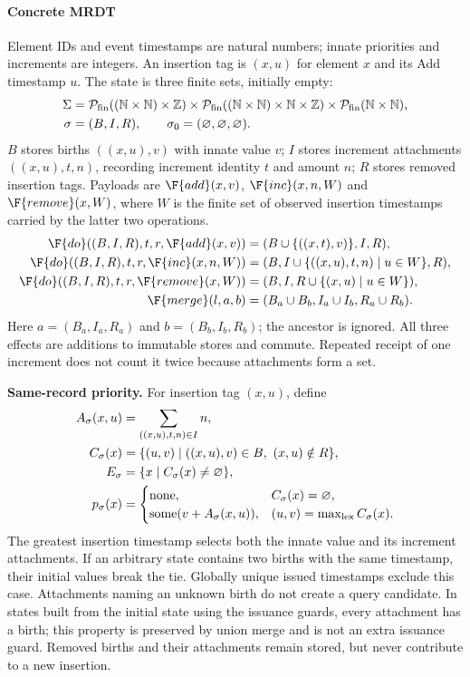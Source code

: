 \paragraph{Concrete MRDT}
Element IDs and event timestamps are natural numbers; innate priorities and
increments are integers. An insertion tag is $(x,u)$ for element $x$ and
its Add timestamp $u$. The state is three finite sets, initially empty:
\[
\begin{aligned}
\Sigma&=\mathcal P_{\rm fin}((\mathbb N\times\mathbb N)\times\mathbb Z)
 \times\mathcal P_{\rm fin}((\mathbb N\times\mathbb N)\times\mathbb N\times\mathbb Z)
 \times\mathcal P_{\rm fin}(\mathbb N\times\mathbb N),\\
\sigma&=(B,I,R),\qquad\sigma_0=(\varnothing,\varnothing,\varnothing).
\end{aligned}
\]
$B$ stores births $((x,u),v)$ with innate value $v$; $I$ stores increment
attachments $((x,u),t,n)$, recording increment identity $t$ and amount $n$;
$R$ stores removed insertion tags. Payloads are $\F{add}(x,v)$,
$\F{inc}(x,n,W)$ and $\F{remove}(x,W)$, where $W$ is the finite set of
observed insertion timestamps carried by the latter two operations.
\[
\begin{aligned}
\F{do}((B,I,R),t,r,\F{add}(x,v))
 &= (B\cup\{((x,t),v)\},I,R),\\
\F{do}((B,I,R),t,r,\F{inc}(x,n,W))
 &= (B,I\cup\{((x,u),t,n)\mid u\in W\},R),\\
\F{do}((B,I,R),t,r,\F{remove}(x,W))
 &= (B,I,R\cup\{(x,u)\mid u\in W\}),\\
\F{merge}(l,a,b)&=(B_a\cup B_b,I_a\cup I_b,R_a\cup R_b).
\end{aligned}
\]
Here $a=(B_a,I_a,R_a)$ and $b=(B_b,I_b,R_b)$; the ancestor is ignored.
All three effects are additions to immutable stores and commute. Repeated
receipt of one increment does not count it twice because attachments form a set.

\textbf{Same-record priority.} For insertion tag $(x,u)$, define
\[
\begin{aligned}
A_\sigma(x,u)&=\sum_{((x,u),t,n)\in I}n,\\
C_\sigma(x)&=\{(u,v)\mid((x,u),v)\in B,\ (x,u)\notin R\},\\
E_\sigma&=\{x\mid C_\sigma(x)\ne\varnothing\},\\
p_\sigma(x)&=\begin{cases}
\operatorname{none},&C_\sigma(x)=\varnothing,\\
\operatorname{some}(v+A_\sigma(x,u)),&(u,v)=\max_{\rm lex}C_\sigma(x).
\end{cases}
\end{aligned}
\]
The greatest insertion timestamp selects both the innate value and its
increment attachments. If an arbitrary state contains two births with the same timestamp, their
initial values break the tie. Globally unique issued timestamps exclude this case.
Attachments naming an unknown birth do not create a query candidate. In
states built from the initial state using the issuance guards, every attachment
has a birth; this property is preserved by union merge and is not an extra
issuance guard. Removed births and their attachments remain stored, but
never contribute to a new insertion.

